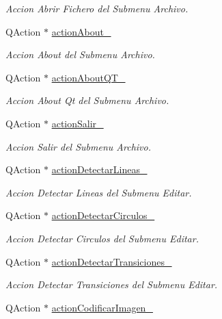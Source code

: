 \begin{DoxyCompactItemize}
\begin{DoxyCompactList}\small\item\em Accion Abrir Fichero del Submenu Archivo. \end{DoxyCompactList}\item 
Q\+Action $\ast$ \hyperlink{classCAplicacion_ac42dda1caacc0506c7015c79fde8416f}{action\+About\+\_\+}
\begin{DoxyCompactList}\small\item\em Accion About del Submenu Archivo. \end{DoxyCompactList}\item 
Q\+Action $\ast$ \hyperlink{classCAplicacion_af0ed23ead2d1c3aea79b724c3cb70249}{action\+About\+Q\+T\+\_\+}
\begin{DoxyCompactList}\small\item\em Accion About Qt del Submenu Archivo. \end{DoxyCompactList}\item 
Q\+Action $\ast$ \hyperlink{classCAplicacion_ac878000751c05f9491a9de6671e6cde0}{action\+Salir\+\_\+}
\begin{DoxyCompactList}\small\item\em Accion Salir del Submenu Archivo. \end{DoxyCompactList}\item 
Q\+Action $\ast$ \hyperlink{classCAplicacion_a5b6d0af534cc0f64dfb7598faa30f3ae}{action\+Detectar\+Lineas\+\_\+}
\begin{DoxyCompactList}\small\item\em Accion Detectar Lineas del Submenu Editar. \end{DoxyCompactList}\item 
Q\+Action $\ast$ \hyperlink{classCAplicacion_ab4c2fb6ecc5d7c21a1f181f0f0af2830}{action\+Detectar\+Circulos\+\_\+}
\begin{DoxyCompactList}\small\item\em Accion Detectar Circulos del Submenu Editar. \end{DoxyCompactList}\item 
Q\+Action $\ast$ \hyperlink{classCAplicacion_acda82e41d91a94e32bbfa21965338f5a}{action\+Detectar\+Transiciones\+\_\+}
\begin{DoxyCompactList}\small\item\em Accion Detectar Transiciones del Submenu Editar. \end{DoxyCompactList}\item 
Q\+Action $\ast$ \hyperlink{classCAplicacion_a06464c87dd4924cc8bb92f946239f603}{action\+Codificar\+Imagen\+\_\+}

\end{DoxyCompactItemize}
